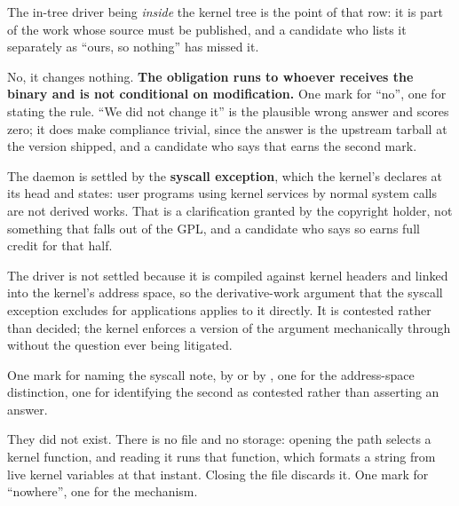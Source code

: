 \noindent The in-tree driver being \emph{inside} the kernel tree is the point of that row: it is
part of the work whose source must be published, and a candidate who lists it separately as ``ours,
so nothing'' has missed it.

No, it changes nothing. \textbf{The obligation runs to whoever receives the binary and is not
conditional on modification.} One mark for ``no'', one for stating the rule. ``We did not change
it'' is the plausible wrong answer and scores zero; it does make compliance trivial, since the
answer is the upstream tarball at the version shipped, and a candidate who says that earns the
second mark.

The daemon is settled by the \textbf{syscall exception}, which the kernel's  declares
at its head and  states: user programs using kernel
services by normal system calls are not derived works. That is a clarification granted by the
copyright holder, not something that falls out of the GPL, and a candidate who says so earns full
credit for that half.

The driver is not settled because it is compiled against kernel headers and linked into the kernel's
address space, so the derivative-work argument that the syscall exception excludes for applications
applies to it directly. It is contested rather than decided; the kernel enforces a version of the
argument mechanically through  without the question ever being litigated.

One mark for naming the syscall note, by  or by , one for the
address-space distinction, one for identifying the second as contested rather than asserting an
answer.


They did not exist. There is no file and no storage: opening the path selects a kernel function, and
reading it runs that function, which formats a string from live kernel variables at that instant.
Closing the file discards it. One mark for ``nowhere'', one for the mechanism.

